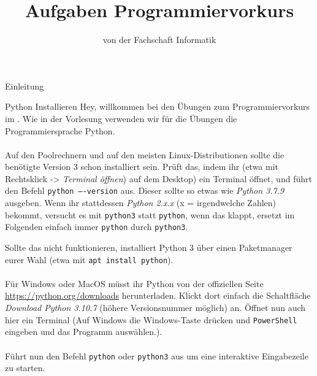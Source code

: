 
\title{Aufgaben Programmiervorkurs}
\subtitle{von der Fachschaft Informatik\hfill\ptitle}

\maketitle{}

\begin{task}[points=auto]{Einleitung}
    \begin{subtask*}[points=0]{Python Installieren}
        Hey, willkommen bei den Übungen zum Programmiervorkurs im \ptitle. Wie in der
        Vorlesung verwenden wir für die Übungen die Programmiersprache Python. \\\\
        Auf den Poolrechnern und auf den meisten Linux-Distributionen sollte die
        benötigte Version 3 schon installiert sein. Prüft das, indem ihr (etwa mit
        Rechtsklick -> \textit{Terminal öffnen}) auf dem Desktop) ein Terminal öffnet,
        und führt den Befehl \texttt{python ----version} aus. Dieser sollte so etwas wie
        \textit{Python 3.7.9} ausgeben. Wenn ihr stattdessen \textit{Python 2.x.x} (x = irgendwelche Zahlen) bekommt, versucht es mit \texttt{python3} statt \texttt{python}, wenn das klappt, ersetzt im Folgenden einfach immer \texttt{python} durch \texttt{python3}.

        Sollte das nicht funktionieren, installiert Python 3 über einen Paketmanager
        eurer Wahl (etwa mit \texttt{apt install python}). \\\\
        Für Windows oder MacOS müsst ihr Python von der offiziellen Seite
        \url{https://python.org/downloads} herunterladen. Klickt dort einfach die
        Schaltfläche \textit{Download Python 3.10.7} (höhere Versionsnummer möglich) an.
        Öffnet nun auch hier ein Terminal (Auf Windows die Windows-Taste drücken und \texttt{PowerShell} eingeben und das Programm auswählen.). \\\\
        Führt nun den Befehl \texttt{python} oder \texttt{python3} aus um eine
        interaktive Eingabezeile zu starten.


\end{subtask*}
\end{task}
